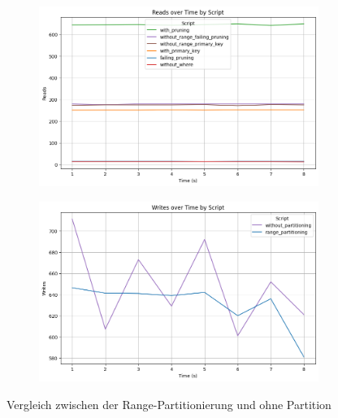 \vspace{-6pt}
\begin{figure}[H]
	\centering
	\begin{subfigure}[t]{0.48\textwidth}
		\includegraphics[width=\textwidth]{PNGs/Script/Partition/range-partition/Reads}
	\end{subfigure}
	\hfill
	\begin{subfigure}[t]{0.48\textwidth}
		\includegraphics[width=\textwidth]{PNGs/Script/Partition/range-partition/Writes}
	\end{subfigure}
	\vspace{-8pt}
	\caption[Range-Partitionierung: Unterschiedliche Selects mit und ohne Partition]{Vergleich zwischen der Range-Partitionierung und ohne Partition}
	\label{fig:range-partition}
\end{figure}
\vspace{-19pt}

